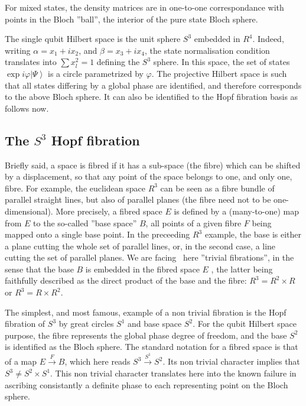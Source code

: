 \documentclass{amsart}
\begin{document}
For mixed states, the density matrices are in one-to-one correspondance with
points in the Bloch ''ball'', the interior of the pure state Bloch sphere.

The single qubit Hilbert space is the unit sphere $S^{3}$ embedded in $R^{4}$.
Indeed, writing $\alpha=x_{1}+ix_{2}$, and $\beta=x_{3}+ix_{4}$, the state
normalisation condition translates into $\sum x_{l}^{2}=1$ defining the
$S^{3}$ sphere. In this space, the set of states $\exp i\varphi\left|
\Psi\right\rangle $ is a circle parametrized by $\varphi$. The projective
Hilbert space is such that all states differing by a global phase are
identified, and therefore corresponds to the above Bloch sphere. It can also
be identified to the Hopf fibration basis as follows now.

\subsection{ The $S^{3}$ Hopf fibration}

Briefly said, a space is fibred if it has a sub-space (the fibre) which can be
shifted by a displacement, so that any point of the space belongs to one, and
only one, fibre. For example, the euclidean space $R^{3}$ can be seen as a
fibre bundle of parallel straight lines, but also of parallel planes (the
fibre need not to be one-dimensional). More precisely, a fibred space $E$ is
defined by a (many-to-one) map from $E$ to the so-called ''base space'' $B$,
all points of a given fibre $F$ being mapped onto a single base point. In the
preceeding $R^{3}$ example, the base is either a plane cutting the whole set
of parallel lines, or, in the second case, a line cutting the set of parallel
planes. We are facing \ here ''trivial fibrations'', in the sense that the
base $B$ is embedded in the fibred space $E$ , the latter being faithfully
described as the direct product of the base and the fibre: $R^{3}=R^{2}\times
R$ or $R^{3}=R\times R^{2}$.

The simplest, and most famous, example of a non trivial fibration is the Hopf
fibration of $S^{3}$ by great circles $S^{1}$ and base space $S^{2}$. For the
qubit Hilbert space purpose, the fibre represents the global phase degree of
freedom, and the base $S^{2}$ is identified as the Bloch sphere. The standard
notation for a fibred space is that of a map $E\overset{F}{\rightarrow}B$,
which here reads $S^{3}\overset{S^{1}}{\rightarrow}S^{2}$. Its non trivial
character implies that $S^{3}\neq S^{2}\times S^{1}$. This non trivial
character translates here into the known failure in ascribing consistantly a
definite phase to each representing point on the Bloch sphere.
\end{document}
